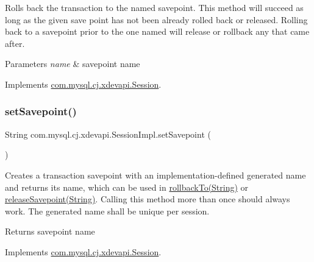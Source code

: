 Rolls back the transaction to the named savepoint. This method will succeed as long as the given save point has not been already rolled back or released. Rolling back to a savepoint prior to the one named will release or rollback any that came after.


\begin{DoxyParams}{Parameters}
{\em name} & savepoint name \\
\hline
\end{DoxyParams}


Implements \mbox{\hyperlink{interfacecom_1_1mysql_1_1cj_1_1xdevapi_1_1_session_a31dc4b454a765a159c591d5cc4f3d1cc}{com.\+mysql.\+cj.\+xdevapi.\+Session}}.

\mbox{\label{classcom_1_1mysql_1_1cj_1_1xdevapi_1_1_session_impl_a3eb7fd3b8ff1e2fc436fc271f1129fae}} 
\subsubsection{\texorpdfstring{set\+Savepoint()}{setSavepoint()}\hspace{0.1cm}{\footnotesize\ttfamily [1/2]}}
{\footnotesize\ttfamily String com.\+mysql.\+cj.\+xdevapi.\+Session\+Impl.\+set\+Savepoint (\begin{DoxyParamCaption}{ }\end{DoxyParamCaption})}

Creates a transaction savepoint with an implementation-\/defined generated name and returns its name, which can be used in \mbox{\hyperlink{classcom_1_1mysql_1_1cj_1_1xdevapi_1_1_session_impl_adcd0910556c2529fe20a6fa85c96a88d}{rollback\+To(\+String)}} or \mbox{\hyperlink{classcom_1_1mysql_1_1cj_1_1xdevapi_1_1_session_impl_a8bf42a1928a6bb71f3047e072b9210b4}{release\+Savepoint(\+String)}}. Calling this method more than once should always work. The generated name shall be unique per session.

\begin{DoxyReturn}{Returns}
savepoint name 
\end{DoxyReturn}


Implements \mbox{\hyperlink{interfacecom_1_1mysql_1_1cj_1_1xdevapi_1_1_session_a4878e02a60bbf177ea77ab94c697cbbf}{com.\+mysql.\+cj.\+xdevapi.\+Session}}.

